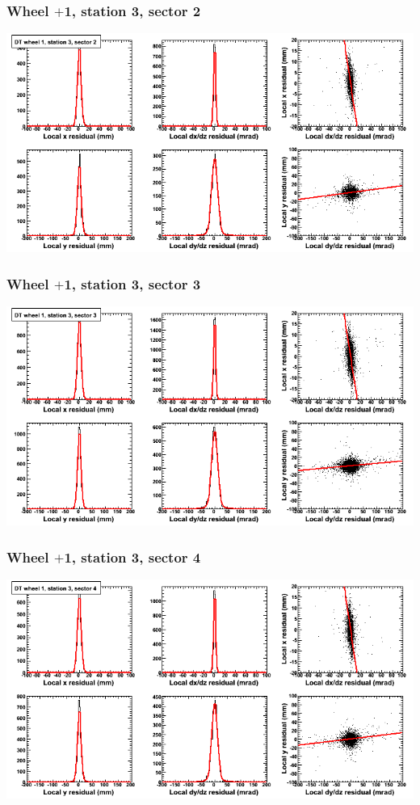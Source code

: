 \documentclass[compress]{beamer}
\begin{document}
\begin{frame}
\frametitle{Wheel $+$1, station 3, sector 2}
\includegraphics[width=\linewidth]{tmpbell_MBwhDst3sec02.png}
\end{frame}

\begin{frame}
\frametitle{Wheel $+$1, station 3, sector 3}
\includegraphics[width=\linewidth]{tmpbell_MBwhDst3sec03.png}
\end{frame}

\begin{frame}
\frametitle{Wheel $+$1, station 3, sector 4}
\includegraphics[width=\linewidth]{tmpbell_MBwhDst3sec04.png}
\end{frame}
\end{document}

